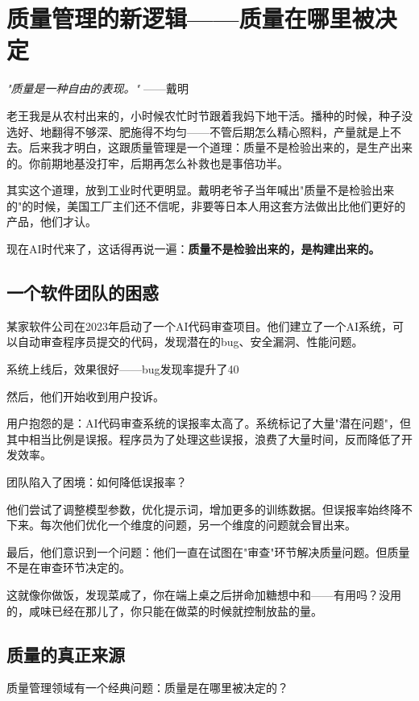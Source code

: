 \chapter{质量管理的新逻辑——质量在哪里被决定}


\textit{"质量是一种自由的表现。"}
——戴明


老王我是从农村出来的，小时候农忙时节跟着我妈下地干活。播种的时候，种子没选好、地翻得不够深、肥施得不均匀——不管后期怎么精心照料，产量就是上不去。后来我才明白，这跟质量管理是一个道理：质量不是检验出来的，是生产出来的。你前期地基没打牢，后期再怎么补救也是事倍功半。

其实这个道理，放到工业时代更明显。戴明老爷子当年喊出"质量不是检验出来的"的时候，美国工厂主们还不信呢，非要等日本人用这套方法做出比他们更好的产品，他们才认。

现在AI时代来了，这话得再说一遍：\textbf{质量不是检验出来的，是构建出来的。}

\section{一个软件团队的困惑}


某家软件公司在2023年启动了一个AI代码审查项目。他们建立了一个AI系统，可以自动审查程序员提交的代码，发现潜在的bug、安全漏洞、性能问题。

系统上线后，效果很好——bug发现率提升了40%

然后，他们开始收到用户投诉。

用户抱怨的是：AI代码审查系统的误报率太高了。系统标记了大量"潜在问题"，但其中相当比例是误报。程序员为了处理这些误报，浪费了大量时间，反而降低了开发效率。

团队陷入了困境：如何降低误报率？

他们尝试了调整模型参数，优化提示词，增加更多的训练数据。但误报率始终降不下来。每次他们优化一个维度的问题，另一个维度的问题就会冒出来。

最后，他们意识到一个问题：他们一直在试图在"审查"环节解决质量问题。但质量不是在审查环节决定的。

这就像你做饭，发现菜咸了，你在端上桌之后拼命加糖想中和——有用吗？没用的，咸味已经在那儿了，你只能在做菜的时候就控制放盐的量。

\section{质量的真正来源}


质量管理领域有一个经典问题：质量是在哪里被决定的？

